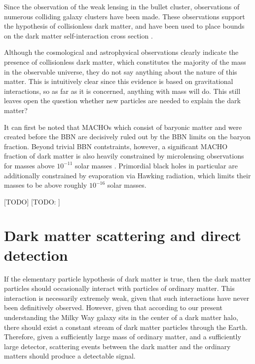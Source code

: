 \documentclass[b5paper, 10pt, twoside]{book}
\newcommand{\typographersred}{scp-red-dark-3}
\newcommand{\todo}[1][]{%
   \ifthenelse{ \equal{#1}{} }
      {\textcolor{\typographersred}{[TODO]}}
      {\textcolor{\typographersred}{[TODO: #1]}}
}
\begin{document}
Since the observation of the weak lensing in the bullet cluster, observations of numerous colliding galaxy clusters have been made. These observations support the hypothesis of collisionless dark matter, and have been used to place bounds on the dark matter self-interaction cross section \parencite{HarveyEtAl2015}.

Although the cosmological and astrophysical observations clearly indicate the presence of collisionless dark matter, which constitutes the majority of the mass in the observable universe, they do not say anything about the nature of this matter. This is intuitively clear since this evidence is based on gravitational interactions, so as far as it is concerned, anything with mass will do. This still leaves open the question whether new particles are needed to explain the dark matter?

It can first be noted that MACHOs which consist of baryonic matter and were created before the BBN are decisively ruled out by the BBN limits on the baryon fraction. Beyond trivial BBN contstraints, however, a significant MACHO fraction of dark matter is also heavily constrained by microlensing observations for masses above $10^{-11}$ solar masses \parencite{BirdEtAl2023}. Primordial black holes in particular are additionally constrained by evaporation via Hawking radiation, which limits their masses to be above roughly $10^{-16}$ solar masses.

\todo

\chapter{Dark matter scattering and direct detection}
\label{chap:direct-detection}

If the elementary particle hypothesis of dark matter is true, then the dark matter particles should occasionally interact with particles of ordinary matter. This interaction is necessarily extremely weak, given that such interactions have never been definitively observed. However, given that according to our present understanding the Milky Way galaxy sits in the center of a dark matter halo, there should exist a constant stream of dark matter particles through the Earth. Therefore, given a sufficiently large mass of ordinary matter, and a sufficiently large detector, scattering events between the dark matter and the ordinary matters should produce a detectable signal.
\end{document}
